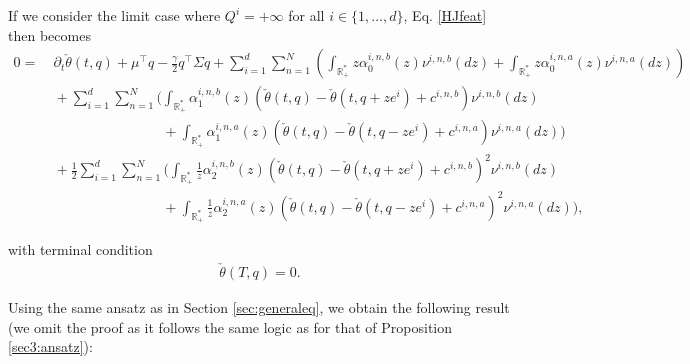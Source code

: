 \documentclass[preprint, 3p]{elsarticle}
\newcommand{\1}{{\chi}}
\begin{document}
If we consider the limit case where $ Q^i = +\infty$ for all $i \in \{1, \ldots, d\}$, Eq. \eqref{HJfeat} then becomes
\begin{align}
 0 = &\ \partial_t \check{\theta}(t,q) + \mu^\intercal q - \frac{\gamma}{2} q^\intercal \Sigma q + \sum_{i=1}^d \sum_{n=1}^N  \left(\int_{\mathbb R_+^*} z\alpha^{i,n,b}_0(z) \nu^{i,n,b}(dz) + \int_{\mathbb R_+^*} z\alpha^{i,n,a}_0(z) \nu^{i,n,a}(dz) \right) \nonumber\\
 &\ + \sum_{i=1}^d \sum_{n=1}^N \Bigg(\int_{\mathbb R_+^*}  \alpha^{i,n,b}_1(z) \left(  \check{\theta}(t,q) - \check{\theta}(t,q+ze^i)  + c^{i,n,b}\right) \nu^{i,n,b}(dz) \nonumber\\
 & \qquad \qquad \qquad \qquad +  \int_{\mathbb R_+^*}\alpha^{i,n,a}_1(z) \left( \check{\theta}(t,q) - \check{\theta}(t,q-ze^i)  + c^{i,n,a} \right) \nu^{i,n,a}(dz)\Bigg)\nonumber\\
 &\ +\frac 12  \sum_{i=1}^d \sum_{n=1}^N \Bigg(\int_{\mathbb R_+^*} \frac 1z  \alpha^{i,n,b}_2(z) \left(  \check{\theta}(t,q) - \check{\theta}(t,q+ze^i)  + c^{i,n,b}\right)^2 \nu^{i,n,b}(dz) \nonumber\\
 & \qquad \qquad \qquad \qquad +  \int_{\mathbb R_+^*} \frac 1z \alpha^{i,n,a}_2(z) \left( \check{\theta}(t,q) - \check{\theta}(t,q-ze^i)  + c^{i,n,a} \right)^2 \nu^{i,n,a}(dz)\Bigg),\label{HJfeatapprox}
\end{align}

with terminal condition
\begin{align}
\label{genCT}
\check \theta (T,q) = 0.
\end{align}

Using the same ansatz as in Section \ref{sec:generaleq}, we obtain the following result (we omit the proof as it follows the same logic as for that of Proposition \ref{sec3:ansatz}):
\end{document}

